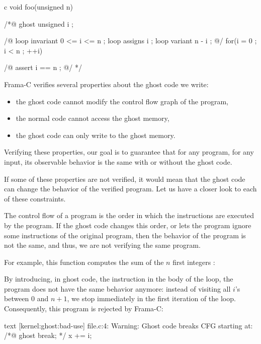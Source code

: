 \begin{CodeBlock}{c}
void foo(unsigned n){
 /*@ ghost
   unsigned i ;

   /@
     loop invariant 0 <= i <= n ;
     loop assigns i ;
     loop variant n - i ;
   @/
   for(i = 0 ; i < n ; ++i){

   }
   /@ assert i == n ; @/
 */
}
\end{CodeBlock}




Frama-C verifies several properties about the ghost code we write:
\begin{itemize}
\item the ghost code cannot modify the control flow graph of the program,
\item the normal code cannot access the ghost memory,
\item the ghost code can only write to the ghost memory.
\end{itemize}

Verifying these properties, our goal is to guarantee that for any
program, for any input, its observable behavior is the same with or
without the ghost code.

If some of these properties are not verified, it would mean that
the ghost code can change the behavior of the verified program.
Let us have a closer look to each of these constraints.




The control flow of a program is the order in which the instructions
are executed by the program. If the ghost code changes this order, or
lets the program ignore some instructions of the original program, then
the behavior of the program is not the same, and thus, we are not
verifying the same program.


For example, this function computes the sum of the $n$ first integers :




By introducing, in ghost code, the instruction  in
the body of the loop, the program does not have the same behavior
anymore: instead of visiting all $i$'s between $0$ and $n+1$, we stop
immediately in the first iteration of the loop. Consequently, this
program is rejected by Frama-C:


\begin{CodeBlock}{text}
[kernel:ghost:bad-use] file.c:4: Warning:
  Ghost code breaks CFG starting at:
  /*@ ghost break; */
  x += i;
\end{CodeBlock}



